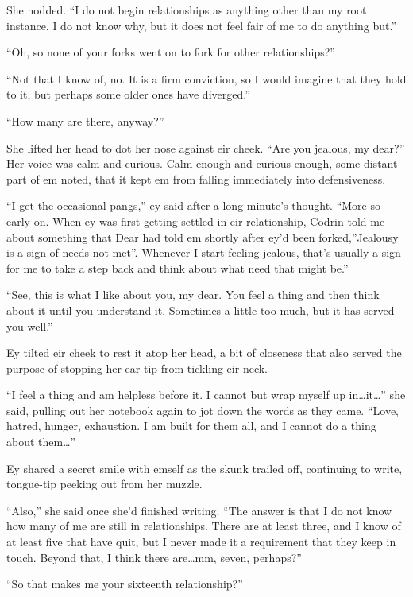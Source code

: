 She nodded. ``I do not begin relationships as anything other than my root instance. I do not know why, but it does not feel fair of me to do anything but.''

``Oh, so none of your forks went on to fork for other relationships?''

``Not that I know of, no. It is a firm conviction, so I would imagine that they hold to it, but perhaps some older ones have diverged.''

``How many are there, anyway?''

She lifted her head to dot her nose against eir cheek. ``Are you jealous, my dear?'' Her voice was calm and curious. Calm enough and curious enough, some distant part of em noted, that it kept em from falling immediately into defensiveness.

``I get the occasional pangs,'' ey said after a long minute's thought. ``More so early on. When ey was first getting settled in eir relationship, Codrin told me about something that Dear had told em shortly after ey'd been forked,''Jealousy is a sign of needs not met''. Whenever I start feeling jealous, that's usually a sign for me to take a step back and think about what need that might be.''

``See, this is what I like about you, my dear. You feel a thing and then think about it until you understand it. Sometimes a little too much, but it has served you well.''

Ey tilted eir cheek to rest it atop her head, a bit of closeness that also served the purpose of stopping her ear-tip from tickling eir neck.

``I feel a thing and am helpless before it. I cannot but wrap myself up in\ldots it\ldots{}'' she said, pulling out her notebook again to jot down the words as they came. ``Love, hatred, hunger, exhaustion. I am built for them all, and I cannot do a thing about them\ldots{}''

Ey shared a secret smile with emself as the skunk trailed off, continuing to write, tongue-tip peeking out from her muzzle.

``Also,'' she said once she'd finished writing. ``The answer is that I do not know how many of me are still in relationships. There are at least three, and I know of at least five that have quit, but I never made it a requirement that they keep in touch. Beyond that, I think there are\ldots mm, seven, perhaps?''

``So that makes me your sixteenth relationship?''

